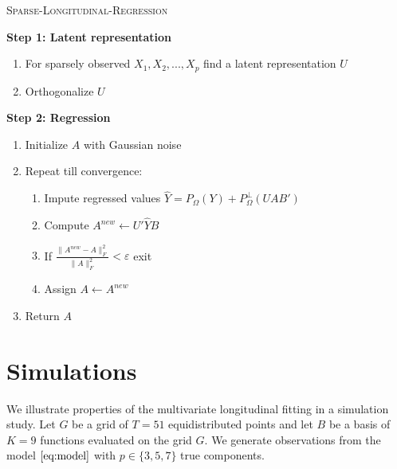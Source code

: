 \documentclass[preprint]{imsart}
\numberwithin{equation}{section}
\theoremstyle{plain}
\newcommand{\tr}[1]{{\textcolor{red}{#1}}}
\DeclareMathOperator*{\diag}{diag}
\begin{document}


\begin{algorithm}
\caption{\textsc{Sparse-Longitudinal-Regression}\label{alg:sparse-regression}}
\vspace{3pt}
\begin{flushleft}
\textbf{Step 1: Latent representation}
\end{flushleft}
\begin{enumerate}
\item For sparsely observed $X_1,X_2,...,X_p$ find a latent representation $U$
\item Orthogonalize $U$
\end{enumerate}
\begin{flushleft}
\textbf{Step 2: Regression}
\end{flushleft}
\begin{enumerate}
\item Initialize $A$ with Gaussian noise
\item Repeat till convergence:
\begin{enumerate}
\item Impute regressed values $\hat{Y} = P_\Omega(Y) + P_\Omega^\perp(UAB')$
\item Compute $A^{new} \leftarrow U'\hat{Y}B$
\item If $\frac{\|A^{new} - A\|_F^2}{\|A\|_F^2} < \varepsilon$ exit
\item Assign $A \leftarrow A^{new}$
\end{enumerate}
\item Return $A$
\end{enumerate}
\end{algorithm}


\section{Simulations}\label{s:simulation}

We illustrate properties of the multivariate longitudinal fitting in a simulation study. Let $G$ be a grid of $T = 51$ equidistributed points and let $B$ be a basis of $K = 9$ functions evaluated on the grid $G$. We generate observations from the model $\eqref{eq:model}$ with $p \in \{3,5,7\}$ true components. %
\end{document}
